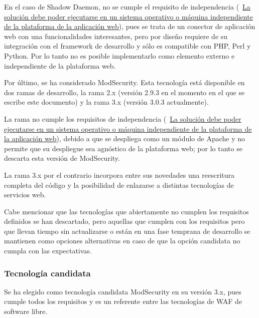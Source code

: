 \par En el caso de Shadow Daemon, no se cumple el requisito de independencia ({~\hyperref[req:independence]{La solución debe poder ejecutarse en un
sistema operativo o máquina independiente de la plataforma de la aplicación web}}), pues se trata de un conector de aplicación web con una
funcionalidades interesantes, pero por diseño requiere de su integración con el framework de desarrollo y sólo es compatible con PHP, Perl y Python. Por
lo tanto no es posible implementarlo como elemento externo e independiente de la plataforma web.

\par Por último, se ha considerado ModSecurity. Esta tecnología está disponible en dos ramas de desarrollo, la rama 2.x (versión 2.9.3 en el momento en
el que se escribe este documento) y la rama 3.x (versión 3.0.3 actualmente).
\par La rama no cumple los requisitos de independencia ({~\hyperref[req:independence]{La solución debe poder ejecutarse en un sistema operativo o
máquina independiente de la plataforma de la aplicación web}}), debido a que se despliega como un módulo de Apache y no permite que su despliegue sea
agnóstico de la plataforma web; por lo tanto se descarta esta versión de ModSecurity.

\par La rama 3.x por el contrario incorpora entre sus novedades una reescritura completa del código y la posibilidad de enlazarse a distintas
tecnologías de servicios web.

\par Cabe mencionar que las tecnologías que abiertamente no cumplen los requisitos definidos se han descartado, pero aquellas que cumplen con los
requisitos pero que llevan tiempo sin actualizarse o están en una fase temprana de desarrollo se mantienen como opciones alternativas en caso de que la
opción candidata no cumpla con las expectativas.
\subsubsection{Tecnología candidata}
\par Se ha elegido como tecnología candidata ModSecurity en su versión 3.x, pues cumple todos los requisitos y es un referente entre las tecnologías de
WAF de software libre.

